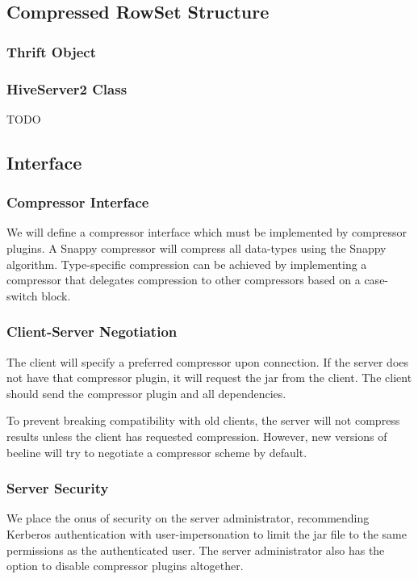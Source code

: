 \documentclass[11pt,a4paper]{article}
\begin{document}
	\subsection{Compressed RowSet Structure}
		\subsubsection{Thrift Object}
		\subsubsection{HiveServer2 Class}
		TODO

	\subsection{Interface}
		\subsubsection{Compressor Interface}
			We will define a compressor interface which must be implemented by compressor plugins.
			A Snappy compressor will compress all data-types using the Snappy algorithm.
			Type-specific compression can be achieved by implementing a compressor that delegates compression to other compressors based on a case-switch block.
		
		
		\subsubsection{Client-Server Negotiation}
			The client will specify a preferred compressor upon connection. 
			If the server does not have that compressor plugin, it will request the jar from the client. 
			The client should send the compressor plugin and all dependencies.
		
			To prevent breaking compatibility with old clients, the server will not compress results unless the client has requested compression.
			However, new versions of beeline will try to negotiate a compressor scheme by default.
		
		\subsubsection{Server Security}
			We place the onus of security on the server administrator, recommending Kerberos authentication with user-impersonation to limit the jar file to the same permissions as the authenticated user. 
			The server administrator also has the option to disable compressor plugins altogether.
		
\end{document}
